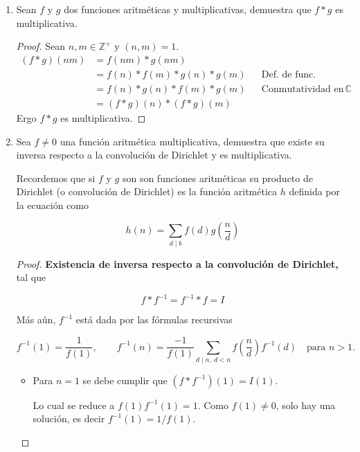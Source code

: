 \documentclass[letterpaper]{article}
\newcommand{\Z}{\mathbb{Z}}
\begin{document}
\begin{enumerate}

\item Sean $f$ y $g$ dos funciones aritméticas y multiplicativas, demuestra que $f \ast g$ es multiplicativa.
\begin{proof}
Sean $n, m \in \Z^+$ y $(n,m) = 1$.
\begin{align*}
    (f \ast g) (nm)
        &= f(nm) \ast g(nm)\\
        &= f(n) \ast f(m) \ast g(n) \ast g(m) && \text{Def. de func. aritmética multiplicativa}\\
        &= f(n) \ast g(n) \ast f(m) \ast g(m) && \text{Conmutatividad en $\mathbb{C}$}\\
        &= (f \ast g) (n) \ast (f \ast g) (m)
\end{align*}
Ergo $f \ast g$ es multiplicativa.
\end{proof}

\item Sea $f \neq 0$ una función aritmética multiplicativa, demuestra que existe su inversa respecto a la
convolución de Dirichlet y es multiplicativa.

Recordemos que si $f$ y $g$ son son funciones aritméticas su producto de Dirichlet (o convolución de
Dirichlet) es la función aritmética $h$ definida por la ecuación como

\[
    h(n) = \sum_{d \mid b} f(d) g \left(\frac{n}{d}\right)
\]

\begin{proof} \textbf{Existencia de inversa respecto a la convolución de Dirichlet,} tal que

\[
    f \ast f^{-1} = f^{-1} \ast f = I
\]

Más aún, $f^{-1}$ está dada por las fórmulas recursivas

\[
    f^{-1}(1) = \frac{1}{f(1)}, \qquad
    f^{-1}(n) = \frac{-1}{f(1)} \sum_{d \mid n, \  d < n} f \left(\frac{n}{d}\right)f^{-1}(d)
        \quad \text{para } n > 1.
\]

\begin{itemize}
    \item Para $n = 1$ se debe cumplir que $(f \ast f^{-1})(1) = I(1)$.
    
    Lo cual se reduce a $f(1)f^{-1}(1) = 1$. Como $f(1) \neq 0$, solo hay una solución, es decir
    $f^{-1}(1) = 1/f(1)$.


\end{itemize}
\end{proof}
\end{enumerate}
\end{document}
